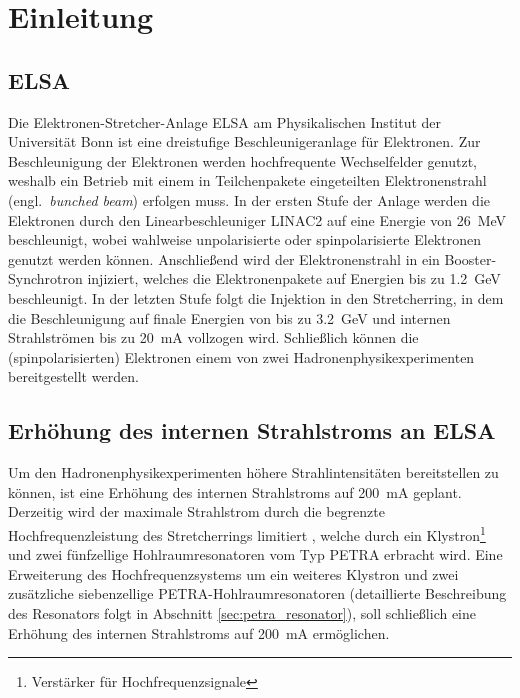 \chapter{Einleitung}
\label{sec:einleitung}

\section{ELSA}
Die Elektronen-Stretcher-Anlage ELSA am Physikalischen Institut der Universität Bonn ist eine dreistufige Beschleunigeranlage für Elektronen.
Zur Beschleunigung der Elektronen werden hochfrequente Wechselfelder genutzt, weshalb ein Betrieb mit einem in Teilchenpakete eingeteilten Elektronenstrahl (engl.\ \textit{bunched beam}) erfolgen muss.
In der ersten Stufe der Anlage werden die Elektronen durch den Linearbeschleuniger LINAC2 auf eine Energie von \SI{26}{MeV} beschleunigt, wobei wahlweise unpolarisierte oder spinpolarisierte Elektronen genutzt werden können.
Anschließend wird der Elektronenstrahl in ein Booster-Synchrotron injiziert, welches die Elektronenpakete auf Energien bis zu \SI{1.2}{GeV} beschleunigt.
In der letzten Stufe folgt die Injektion in den Stretcherring, in dem die Beschleunigung auf finale Energien von bis zu \SI{3.2}{GeV} und internen Strahlströmen bis zu \SI{20}{mA} vollzogen wird.
Schließlich können die (spinpolarisierten) Elektronen einem von zwei Hadronenphysikexperimenten bereitgestellt werden.


\section{Erhöhung des internen Strahlstroms an ELSA}
Um den Hadronenphysikexperimenten höhere Strahlintensitäten bereitstellen zu können, ist eine Erhöhung des internen Strahlstroms auf \SI{200}{mA} geplant.
Derzeitig wird der maximale Strahlstrom durch die begrenzte Hochfrequenzleistung des Stretcherrings limitiert \cite{schedler}, welche durch ein Klystron\footnote{Verstärker für Hochfrequenzsignale} und zwei fünfzellige Hohlraumresonatoren vom Typ PETRA erbracht wird.
Eine Erweiterung des Hochfrequenzsystems um ein weiteres Klystron und zwei zusätzliche siebenzellige PETRA-Hohlraumresonatoren (detaillierte Beschreibung des Resonators folgt in Abschnitt \ref{sec:petra_resonator}), soll schließlich eine Erhöhung des internen Strahlstroms auf \SI{200}{mA} ermöglichen.

